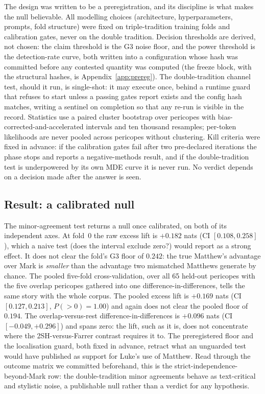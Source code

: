 \documentclass[11pt,letterpaper]{article}
\begin{document}
The design was written to be a preregistration, and its discipline is what makes the null believable. All modelling choices (architecture, hyperparameters, prompts, fold structure) were fixed on triple-tradition training folds and calibration gates, never on the double tradition. Decision thresholds are derived, not chosen: the claim threshold is the G3 noise floor, and the power threshold is the detection-rate curve, both written into a configuration whose hash was committed before any contested quantity was computed (the freeze block, with the structural hashes, is Appendix~\ref{app:prereg}). The double-tradition channel test, should it run, is single-shot: it may execute once, behind a runtime guard that refuses to start unless a passing gates report exists and the config hash matches, writing a sentinel on completion so that any re-run is visible in the record. Statistics use a paired cluster bootstrap over pericopes with bias-corrected-and-accelerated intervals \citep{efron1987,efron1993} and ten thousand resamples; per-token likelihoods are never pooled across pericopes without clustering. Kill criteria were fixed in advance: if the calibration gates fail after two pre-declared iterations the phase stops and reports a negative-methods result, and if the double-tradition test is underpowered by its own MDE curve it is never run. No verdict depends on a decision made after the answer is seen.

\subsection{Result: a calibrated null}

The minor-agreement test returns a null once calibrated, on both of its independent axes. At fold~0 the raw excess lift is $+0.182$ nats (CI $[0.108, 0.258]$), which a naive test (does the interval exclude zero?) would report as a strong effect. It does not clear the fold's G3 floor of $0.242$: the true Matthew's advantage over Mark is \emph{smaller} than the advantage two mismatched Matthews generate by chance. The pooled five-fold cross-validation, over all 65 held-out pericopes with the five overlap pericopes gathered into one difference-in-differences, tells the same story with the whole corpus. The pooled excess lift is $+0.169$ nats (CI $[0.127, 0.213]$, $P(\!>\!0)=1.00$) and again does not clear the pooled floor of $0.194$. The overlap-versus-rest difference-in-differences is $+0.096$ nats (CI $[-0.049, +0.296]$) and spans zero: the lift, such as it is, does not concentrate where the 2SH-versus-Farrer contrast requires it to. The preregistered floor and the localisation guard, both fixed in advance, retract what an unguarded test would have published as support for Luke's use of Matthew. Read through the outcome matrix we committed beforehand, this is the strict-independence-beyond-Mark row: the double-tradition minor agreements behave as text-critical and stylistic noise, a publishable null rather than a verdict for any hypothesis.
\end{document}
